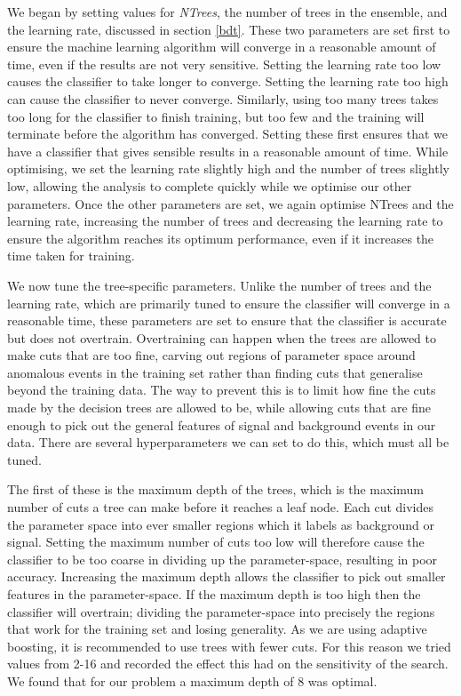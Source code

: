 \documentclass[11pt]{cuthesis}
\begin{document}
We began by setting values for \textit{NTrees}, the number of trees in the ensemble, and the learning rate, discussed in section \ref{bdt}. These two parameters are set first to ensure the machine learning algorithm will converge in a reasonable amount of time, even if the results are not very sensitive. Setting the learning rate too low causes the classifier to take longer to converge. Setting the learning rate too high can cause the classifier to never converge. Similarly, using too many trees takes too long for the classifier to finish training, but too few and the training will terminate before the algorithm has converged. Setting these first ensures that we have a classifier that gives sensible results in a reasonable amount of time. While optimising, we set the learning rate slightly high and the number of trees slightly low, allowing the analysis to complete quickly while we optimise our other parameters. Once the other parameters are set, we again optimise NTrees and the learning rate, increasing the number of trees and decreasing the learning rate to ensure the algorithm reaches its optimum performance, even if it increases the time taken for training.

We now tune the tree-specific parameters. Unlike the number of trees and the learning rate, which are primarily tuned to ensure the classifier will converge in a reasonable time, these parameters are set to ensure that the classifier is accurate but does not overtrain. Overtraining can happen when the trees are allowed to make cuts that are too fine, carving out regions of parameter space around anomalous events in the training set rather than finding cuts that generalise beyond the training data. The way to prevent this is to limit how fine the cuts made by the decision trees are allowed to be, while allowing cuts that are fine enough to pick out the general features of signal and background events in our data. There are several hyperparameters we can set to do this, which must all be tuned. 

The first of these is the maximum depth of the trees, which is the maximum number of cuts a tree can make before it reaches a leaf node. Each cut divides the parameter space into ever smaller regions which it labels as background or signal. Setting the maximum number of cuts too low will therefore cause the classifier to be too coarse in dividing up the parameter-space, resulting in poor accuracy. Increasing the maximum depth allows the classifier to pick out smaller features in the parameter-space. If the maximum depth is too high then the classifier will overtrain; dividing the parameter-space into precisely the regions that work for the training set and losing generality. As we are using adaptive boosting, it is recommended \cite{tmva_guide} to use trees with fewer cuts. For this reason we tried values from 2-16 and recorded the effect this had on the sensitivity of the search. We found that for our problem a maximum depth of 8 was optimal. 
\end{document}

